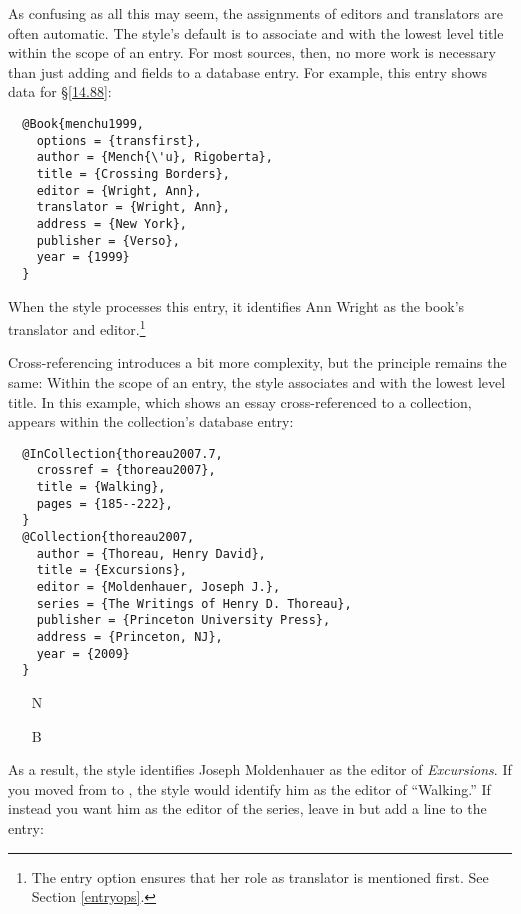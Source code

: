 \documentclass[11pt,letterpaper,oneside]{article}
\begin{document}
As confusing as all this may seem, the assignments of editors and
translators are often automatic. The style's default is to associate
 and  with the lowest level
title within the scope of an entry. For most sources, then, no more
work is necessary than just adding  and
 fields to a database entry. For example, this
entry shows data for \S\ref{14.88}:

\begin{lstlisting}
  @Book{menchu1999,
    options = {transfirst},
    author = {Mench{\'u}, Rigoberta},
    title = {Crossing Borders},
    editor = {Wright, Ann},
    translator = {Wright, Ann},
    address = {New York},
    publisher = {Verso},
    year = {1999}
  }
\end{lstlisting}

\noindent When the style processes this entry, it identifies Ann
Wright as the book's translator and editor.\footnote{The entry option
 ensures that her role as translator is mentioned
first. See Section \ref{entryops}.}

Cross-referencing introduces a bit more complexity, but the principle
remains the same: Within the scope of an entry, the style associates
 and  with the lowest level
title. In this example, which shows an essay cross-referenced to a
collection,  appears within the collection's database
entry:

\begin{lstlisting}
  @InCollection{thoreau2007.7,
    crossref = {thoreau2007},
    title = {Walking},
    pages = {185--222},
  }
  @Collection{thoreau2007,
    author = {Thoreau, Henry David},
    title = {Excursions},
    editor = {Moldenhauer, Joseph J.},
    series = {The Writings of Henry D. Thoreau},
    publisher = {Princeton University Press},
    address = {Princeton, NJ},
    year = {2009}
  }
\end{lstlisting}

\begin{itemize}
\item[N] 

\item[B] 
\end{itemize}

\noindent As a result, the style identifies Joseph Moldenhauer as the
editor of \textit{Excursions}. If you moved  from
 to , the
style would identify him as the editor of ``Walking.'' If instead you
want him as the editor of the series, leave  in
 but add a line to the entry:
\end{document}
